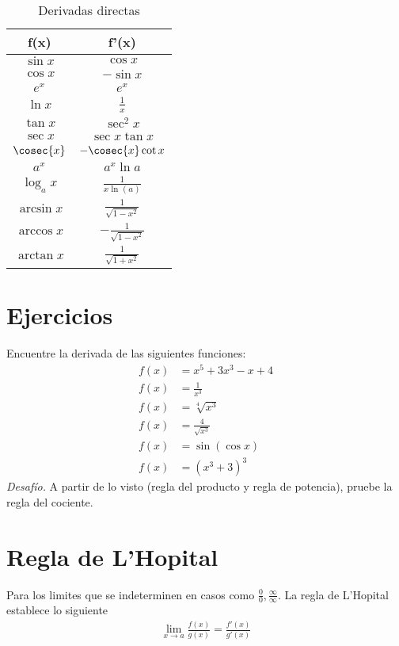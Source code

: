 \documentclass[spanish,12pt]{article}
\begin{document}
\begin{table}[h!]
    \centering
    \begin{tabular}{|cc|}
     \toprule
         f(x)&f'(x)  \\
    \midrule    
        $\sin{x}$ &  $\cos{x}$\\
        $\cos{x}$& $-\sin{x}$\\
        $e^x$&$e^x$\\
        $\ln{x}$& $\frac{1}{x}$\\
        $\tan{x}$& $\sec^2{x}$\\
        $\sec{x}$& $\sec{x}\tan{x}$\\
        $\cosec{x}$& $-\cosec{x}\cot{x}$\\
        $a^x$&$a^x\ln{a}$\\
        $\log_a{x}$&$\frac{1}{x\ln(a)}$\\
        $\arcsin{x}$& $\frac{1}{\sqrt{1-x^2}}$\\
        $\arccos{x}$&$-\frac{1}{\sqrt{1-x^2}}$\\
        $\arctan{x}$&$\frac{1}{\sqrt{1+x^2}}$\\
    \bottomrule
    \end{tabular}
    \caption{Derivadas directas}
    \label{tab:my_label}
\end{table}
\section{Ejercicios}
Encuentre la derivada de las siguientes funciones:
\begin{align*}
    f(x)&=x^5+3x^3-x+4\\
    f(x)&=\frac{1}{x^3}\\
    f(x)&=\sqrt[4]{x^3}\\
    f(x)&=\frac{4}{\sqrt{x^3}}\\
    f(x)&=\sin{(\cos{x})}\\
    f(x)&=(x^3+3)^3
\end{align*}
\textit{Desafío.} A partir de lo visto (regla del producto y regla de potencia), pruebe la regla del cociente.

\section{Regla de L'Hopital}

Para los limites que se indeterminen en casos como $\frac{0}{0} , \frac{\infty}{\infty}$. La regla de L'Hopital establece lo siguiente
\begin{align*}
    \lim\limits_{x\to a} \frac{f(x)}{g(x)}=\frac{f'(x)}{g'(x)}
\end{align*}
\end{document}
